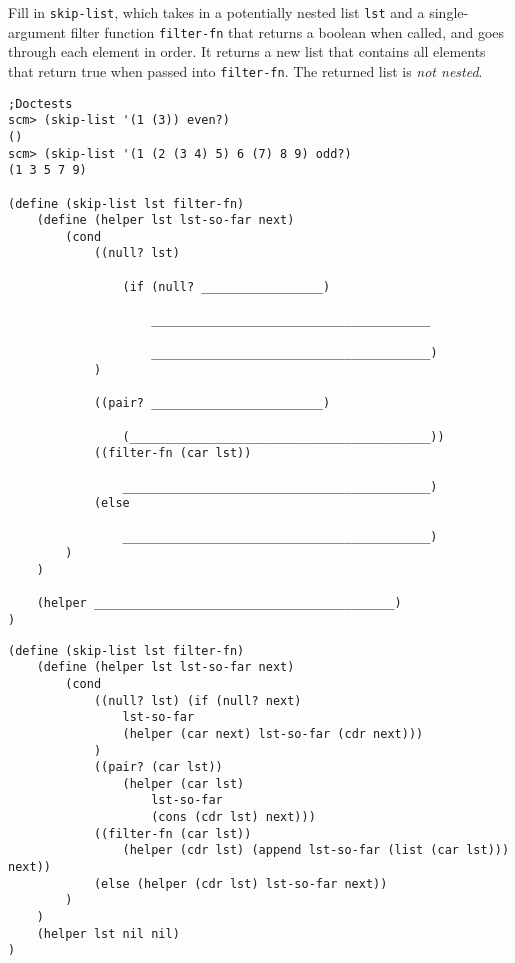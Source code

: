 \question Fill in \lstinline{skip-list}, which takes in a potentially nested list \lstinline{lst} and a single-argument filter function \lstinline{filter-fn} that returns a boolean when called, and goes through each element in order. It returns a new list that contains all elements that return true when passed into \lstinline{filter-fn}. The returned list is \textit{not nested}.

\begin{lstlisting}
;Doctests
scm> (skip-list '(1 (3)) even?)
()
scm> (skip-list '(1 (2 (3 4) 5) 6 (7) 8 9) odd?)
(1 3 5 7 9)

(define (skip-list lst filter-fn)
    (define (helper lst lst-so-far next)
        (cond
            ((null? lst)

                (if (null? _________________)

                    _______________________________________

                    _______________________________________)
            )

            ((pair? ________________________)

                (__________________________________________))
            ((filter-fn (car lst))

                ___________________________________________)
            (else

                ___________________________________________)
        )
    )

    (helper __________________________________________)
)
\end{lstlisting}

\begin{solution}
\begin{lstlisting}
(define (skip-list lst filter-fn)
    (define (helper lst lst-so-far next)
        (cond
            ((null? lst) (if (null? next)
                lst-so-far
                (helper (car next) lst-so-far (cdr next)))
            )
            ((pair? (car lst))
                (helper (car lst)
                    lst-so-far
                    (cons (cdr lst) next)))
            ((filter-fn (car lst))
                (helper (cdr lst) (append lst-so-far (list (car lst))) next))
            (else (helper (cdr lst) lst-so-far next))
        )
    )
    (helper lst nil nil)
)

\end{lstlisting}
\end{solution}

